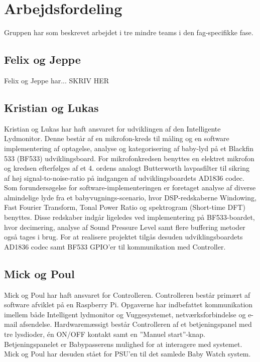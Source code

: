\section{Arbejdsfordeling}

Gruppen har som beskrevet arbejdet i tre mindre teams i den fag-specifikke fase. 

\subsection*{Felix og Jeppe}
Felix og Jeppe har... SKRIV HER

\subsection*{Kristian og Lukas}
Kristian og Lukas har haft ansvaret for udviklingen af den Intelligente Lydmonitor. Denne består af en mikrofon-kreds til måling  og en software implementering af optagelse, analyse og kategorisering af baby-lyd på et Blackfin 533 (BF533) udviklingsboard. For mikrofonkredsen benyttes en elektret mikrofon og kredsen efterfølges af et 4. ordens analogt Butterworth lavpasfilter til sikring af høj signal-to-noise-ratio på indgangen af udviklingsboardets AD1836 codec. Som forundersøgelse for software-implementeringen er foretaget analyse af diverse almindelige lyde fra et babyvugnings-scenario, hvor DSP-redskaberne Windowing, Fast Fourier Transform, Tonal Power Ratio og spektrogram (Short-time DFT) benyttes. Disse redskaber indgår ligeledes ved implementering på BF533-boardet, hvor decimering, analyse af Sound Pressure Level samt flere buffering metoder også tages i brug. For at realisere projektet tilgås desuden udviklingsboardets AD1836 codec samt BF533 GPIO'er til kommunikation med Controller. 

\subsection*{Mick og Poul}
Mick og Poul har haft ansvaret for Controlleren. Controlleren består primært af software afviklet på en Raspberry Pi. Opgaverne har indbefattet kommunikation imellem både Intelligent lydmonitor og Vuggesystemet, netværksforbindelse og e-mail afsendelse. 
Hardwaremæssigt består Controlleren af et betjeningspanel med tre lysdioder, én ON/OFF kontakt samt en ''Manuel start''-knap. Betjeningspanelet er Babypasserens mulighed for at interagere med systemet.
Mick og Poul har desuden stået for PSU'en til det samlede Baby Watch system.


